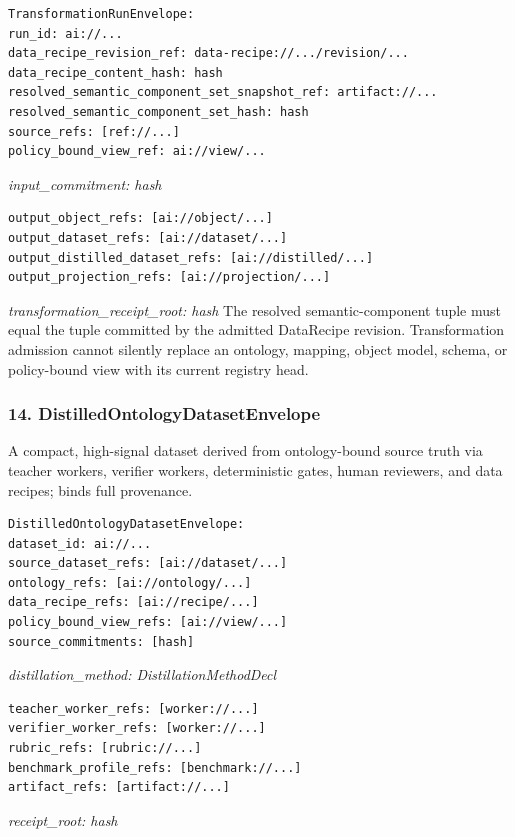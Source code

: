 \documentclass[
  11pt,
]{article}
\begin{document}
\begin{lstlisting}[language=rustioi]
TransformationRunEnvelope:
run_id: ai://...
data_recipe_revision_ref: data-recipe://.../revision/...
data_recipe_content_hash: hash
resolved_semantic_component_set_snapshot_ref: artifact://...
resolved_semantic_component_set_hash: hash
source_refs: [ref://...]
policy_bound_view_ref: ai://view/...
\end{lstlisting}
\emph{input\_commitment: hash}

\begin{lstlisting}[language={},basicstyle=\ttfamily\scriptsize]
output_object_refs: [ai://object/...]
output_dataset_refs: [ai://dataset/...]
output_distilled_dataset_refs: [ai://distilled/...]
output_projection_refs: [ai://projection/...]
\end{lstlisting}
\emph{transformation\_receipt\_root: hash}
The resolved semantic-component tuple must equal the tuple committed by the
admitted DataRecipe revision. Transformation admission cannot silently replace
an ontology, mapping, object model, schema, or policy-bound view with its
current registry head.

\hypertarget{distilledontologydatasetenvelope}{%
\subsubsection{14.
DistilledOntologyDatasetEnvelope}\label{distilledontologydatasetenvelope}}

A compact, high-signal dataset derived from ontology-bound source truth
via teacher workers, verifier workers, deterministic gates, human
reviewers, and data recipes; binds full provenance.

\begin{lstlisting}[language={},basicstyle=\ttfamily\scriptsize]
DistilledOntologyDatasetEnvelope:
dataset_id: ai://...
source_dataset_refs: [ai://dataset/...]
ontology_refs: [ai://ontology/...]
data_recipe_refs: [ai://recipe/...]
policy_bound_view_refs: [ai://view/...]
source_commitments: [hash]
\end{lstlisting}
\emph{distillation\_method: DistillationMethodDecl}

\begin{lstlisting}[language={},basicstyle=\ttfamily\scriptsize]
teacher_worker_refs: [worker://...]
verifier_worker_refs: [worker://...]
rubric_refs: [rubric://...]
benchmark_profile_refs: [benchmark://...]
artifact_refs: [artifact://...]
\end{lstlisting}
\emph{receipt\_root: hash}
\end{document}
